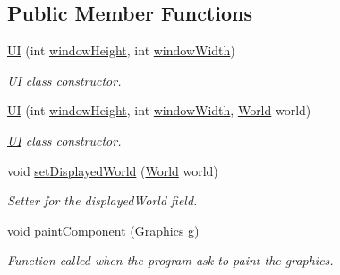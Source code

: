\subsection*{Public Member Functions}
\begin{DoxyCompactItemize}
\item 
\hyperlink{classwindow_1_1ui_1_1_u_i_ae48e53ac4da8caa19bfd6e1cff8b6262}{U\-I} (int \hyperlink{classwindow_1_1ui_1_1_u_i_ad1a84d64616615d037c1ebca54647610}{window\-Height}, int \hyperlink{classwindow_1_1ui_1_1_u_i_a4c35432cda424d024255606d4f95caf2}{window\-Width})
\begin{DoxyCompactList}\small\item\em \hyperlink{classwindow_1_1ui_1_1_u_i}{U\-I} class constructor. \end{DoxyCompactList}\item 
\hyperlink{classwindow_1_1ui_1_1_u_i_ad94ab572839f214ddf1879ec824b200f}{U\-I} (int \hyperlink{classwindow_1_1ui_1_1_u_i_ad1a84d64616615d037c1ebca54647610}{window\-Height}, int \hyperlink{classwindow_1_1ui_1_1_u_i_a4c35432cda424d024255606d4f95caf2}{window\-Width}, \hyperlink{classworld_1_1_world}{World} world)
\begin{DoxyCompactList}\small\item\em \hyperlink{classwindow_1_1ui_1_1_u_i}{U\-I} class constructor. \end{DoxyCompactList}\item 
void \hyperlink{classwindow_1_1ui_1_1_u_i_a766e5251d735ff629b5153f99416a9a8}{set\-Displayed\-World} (\hyperlink{classworld_1_1_world}{World} world)
\begin{DoxyCompactList}\small\item\em Setter for the displayed\-World field. \end{DoxyCompactList}\item 
void \hyperlink{classwindow_1_1ui_1_1_u_i_a8cc928807d8b0aec6e3a5b9556748989}{paint\-Component} (Graphics g)
\begin{DoxyCompactList}\small\item\em Function called when the program ask to paint the graphics. \end{DoxyCompactList}\end{DoxyCompactItemize}
